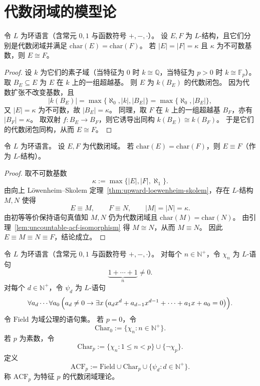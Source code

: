 \documentclass[lang=cn,a4paper,newtx,section]{elegantbook}
\begin{document}
\section{代数闭域的模型论}

\begin{lemma}
\label{uncountable-acf-isomorphism}
令 $L$ 为环语言（含常元 $0,1$ 与函数符号 $+,-,\cdot$）。
设 $E,F$ 为 $L$-结构，且它们分别是代数闭域并满足 $\mathrm{char}(E)=\mathrm{char}(F)$。
若 $\lvert E\rvert=\lvert F\rvert=\kappa$ 且 $\kappa$ 为不可数基数，则 $E\cong F$。
\end{lemma}

\begin{proof}
设 $k$ 为它们的素子域（当特征为 $0$ 时 $k\cong\mathbb Q$，当特征为 $p>0$ 时 $k\cong\mathbb F_p$）。
取 $B_E\subseteq E$ 为 $E$ 在 $k$ 上的一组超越基。
则 $E$ 为 $k(B_E)$ 的代数闭包。
因为代数扩张不改变基数，且
\[
  \lvert k(B_E)\rvert=\max\{\aleph_0,\lvert k\rvert,\lvert B_E\rvert\}=\max\{\aleph_0,\lvert B_E\rvert\},
\]
又 $\lvert E\rvert=\kappa$ 为不可数，故 $\lvert B_E\rvert=\kappa$。
同理，取 $F$ 在 $k$ 上的一组超越基 $B_F$，亦有 $\lvert B_F\rvert=\kappa$。
取双射 $f:B_E\to B_F$，则它诱导出同构 $k(B_E)\cong k(B_F)$。
于是它们的代数闭包同构，从而 $E\cong F$。
\end{proof}

\begin{theorem}
\label{acf-same-char-elementary-equivalence}
令 $L$ 为环语言。
设 $E,F$ 为代数闭域。
若 $\mathrm{char}(E)=\mathrm{char}(F)$，则 $E\equiv F$（作为 $L$-结构）。
\end{theorem}

\begin{proof}
取不可数基数
\[
  \kappa:=\max\{\lvert E\rvert,\lvert F\rvert,\aleph_1\}.
\]
由向上 Löwenheim--Skolem 定理~\ref{thm:upward-loewenheim-skolem}，存在 $L$-结构 $M,N$ 使得
\[
  E\equiv M,\qquad F\equiv N,\qquad \lvert M\rvert=\lvert N\rvert=\kappa.
\]
由初等等价保持语句真值知 $M,N$ 仍为代数闭域且 $\mathrm{char}(M)=\mathrm{char}(N)$。
由引理~\ref{lem:uncountable-acf-isomorphism} 得 $M\cong N$，从而 $M\equiv N$。
 因此 $E\equiv M\equiv N\equiv F$，结论成立。
 \end{proof}

\begin{definition}
\label{acf_p}
令 $L$ 为环语言（含常元 $0,1$ 与函数符号 $+,-,\cdot$）。
对每个 $n\in\mathbb N^{+}$，令 $\chi_n$ 为 $L$-语句
\[
  \underbrace{1+\cdots+1}_{n}\neq 0.
\]
对每个 $d\in\mathbb N^{+}$，令 $\psi_d$ 为 $L$-语句
\[
  \forall a_d\cdots\forall a_0\,\Bigl(a_d\neq 0\to\exists x\,\bigl(a_d x^d+a_{d-1}x^{d-1}+\cdots+a_1x+a_0=0\bigr)\Bigr).
\]
令 $\mathrm{Field}$ 为域公理的语句集。
若 $p=0$，令
\[
  \mathrm{Char}_0:=\{\chi_n:n\in\mathbb N^{+}\}.
\]
若 $p$ 为素数，令
\[
  \mathrm{Char}_p:=\{\chi_n:1\le n<p\}\cup\{\neg\chi_p\}.
\]
定义
\[
  \mathrm{ACF}_p:=\mathrm{Field}\cup\mathrm{Char}_p\cup\{\psi_d:d\in\mathbb N^{+}\}.
\]
称 $\mathrm{ACF}_p$ 为特征 $p$ 的代数闭域理论。
\end{definition}
\end{document}
